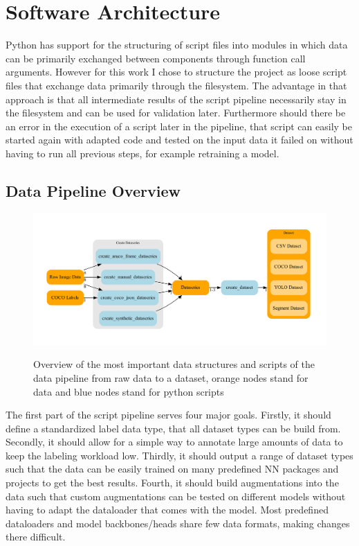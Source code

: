\documentclass[10pt]{book}
\begin{document}
\section{Software Architecture}

Python has support for the structuring of script files into modules in which data can be primarily exchanged between components through function call arguments. However for this work I chose to structure the project as loose script files that exchange data primarily through the filesystem. The advantage in that approach is that all intermediate results of the script pipeline necessarily stay in the filesystem and can be used for validation later. Furthermore should there be an error in the execution of a script later in the pipeline, that script can easily be started again with adapted code and tested on the input data it failed on without having to run all previous steps, for example retraining a model.

\subsection{Data Pipeline Overview}

\begin{figure}
  \caption{Overview of the most important data structures and scripts of the data pipeline from raw data to a dataset, orange nodes stand for data and blue nodes stand for python scripts}
  \includegraphics[width=\textwidth]{graph/arch_data}
  \label{fig:arch_data}
\end{figure}

The first part of the script pipeline serves four major goals. Firstly, it should define a standardized label data type, that all dataset types can be build from. Secondly, it should allow for a simple way to annotate large amounts of data to keep the labeling workload low. Thirdly, it should output a range of dataset types such that the data can be easily trained on many predefined \ac{NN} packages and projects to get the best results. Fourth, it should build augmentations into the data such that custom augmentations can be tested on different models without having to adapt the dataloader that comes with the model. Most predefined dataloaders and model backbones/heads share few data formats, making changes there difficult.
\end{document}
